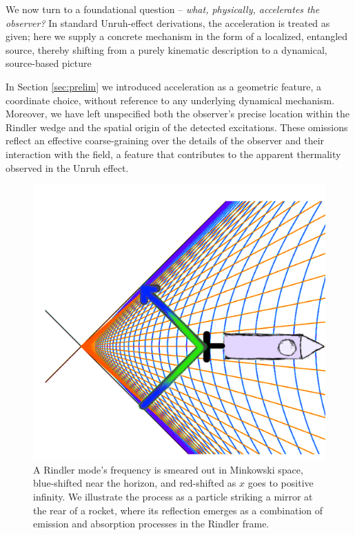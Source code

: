 \documentclass[12pt,a4paper]{article}
\begin{document}
We now turn to a foundational question -- {\it what, physically, accelerates the observer?} In standard Unruh-effect derivations, the acceleration is treated as given; here we supply a concrete mechanism in the form of a localized, entangled source, thereby shifting from a purely kinematic description to a dynamical, source-based picture

In Section \ref{sec:prelim} we introduced acceleration as a geometric feature, a coordinate choice, without reference to any underlying dynamical mechanism. Moreover, we have left unspecified both the observer’s precise location within the Rindler wedge and the spatial origin of the detected excitations. These omissions reflect an effective coarse-graining over the details of the observer and their interaction with the field, a feature that contributes to the apparent thermality observed in the Unruh effect.

\begin{figure}[h]
\centering
\includegraphics[scale=1.0]{emit_absorb.png}
\captionsetup{width=0.7\textwidth}
\caption{A Rindler mode's frequency is smeared out in Minkowski space, blue-shifted near the horizon, and red-shifted as $x$ goes to positive infinity. We illustrate the process as a particle striking a mirror at the rear of a rocket, where its reflection emerges as a combination of emission and absorption processes in the Rindler frame.}
\label{emit_absorb}
\end{figure}
\end{document}
